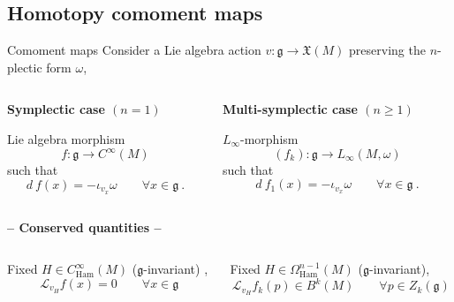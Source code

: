 \documentclass[beamer,10pt]{standalone}
\begin{document}


\subsection{Homotopy comoment maps}


\begin{frame}{Comoment maps}
	Consider a Lie algebra action $v:\mathfrak{g} \to \mathfrak{X}(M)$  preserving the $n$-plectic form $\omega$,
	\vfill
	\begin{columns}
		\begin{column}{.5\linewidth}	
	\textbf{Symplectic case $(n=1)$}
		\begin{defblock}
			Lie algebra morphism
			$$ f: \mathfrak{g} \to C^\infty(M) $$
			such that
			$$ d~f (x) = -\iota_{v_x} \omega \qquad \forall x \in \mathfrak{g}~.$$
		\end{defblock}		
		\end{column}
		\begin{column}{.5\linewidth}	
	\textbf{Multi-symplectic case $(n\geq 1)$}
		\begin{defblock}
			$L_\infty$-morphism 
			$$ (f_k) : \mathfrak{g} \to L_\infty (M,\omega)$$
			such that
			$$ d~f_1(x) = -\iota_{v_x} \omega \qquad \forall x \in \mathfrak{g}~.$$
		\end{defblock}		
		\end{column}
	\end{columns}	
	\pause
	\centering \textbf{-- Conserved quantities --}
	\begin{columns}
		\begin{column}{.5\linewidth}		
			\begin{propblock}
				\small Fixed $H\in C^\infty_{\text{Ham}}(M)$ ($\mathfrak{g}$-invariant) ,
				$$\mathcal{L}_{v_H} f(x) = 0 \qquad \forall x \in \mathfrak{g}$$
			\end{propblock}
		\end{column}
		\begin{column}{.5\linewidth}			
			\begin{propblock}
				\small Fixed $H\in \Omega^{n-1}_{\text{Ham}}(M)$ ($\mathfrak{g}$-invariant),
				$$\mathcal{L}_{v_H} f_k(p) \in B^k(M) \qquad \forall p \in Z_k(\mathfrak{g})$$			
			\end{propblock}
		\end{column}
	\end{columns}



\end{frame}
\end{document}
